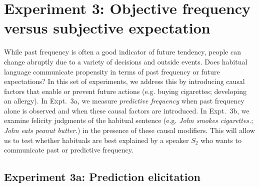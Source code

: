 \documentclass[10pt,letterpaper]{article}
\newcommand{\ndg}[1]{\textcolor{Green}{[ndg: #1]}}
\begin{document}
\section{Experiment 3: Objective frequency versus subjective expectation}


While past frequency is often a good indicator of future tendency, people can change abruptly due to a variety of decisions and outside events.
Does habitual language communicate propensity in terms of past frequency or future expectations?
In this set of experiments, we address this by introducing causal factors that enable or prevent future actions (e.g. buying cigarettes; developing an allergy).
In Expt.~3a, we measure \emph{predictive frequency} when past frequency alone is observed and when these causal factors are introduced.
In Expt.~3b, we examine felicity judgments of the habitual sentence (e.g. \emph{John smokes cigarettes.}; \emph{John eats peanut butter.}) in the presence of these causal modifiers.
This will allow us to test whether habituals are best explained by a speaker $S_2$ who wants to communicate past or predictive frequency.

\subsection{Experiment 3a: Prediction elicitation}
\end{document}
